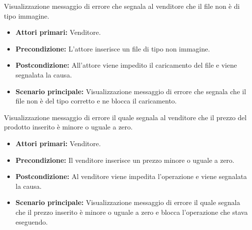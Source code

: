 \begin{comment}
\UC{Visualizzazione messaggio di errore prodotto non disponibile}
L'acquirente o l'utente non autenticato richiede un prodotto che non è disponibile.
\begin{itemize}
    \item \textbf{Attori primari:} acquirente o utente non autenticato;
    \item \textbf{Precondizione:} L'attore richiede di aggiungere al carrello un prodotto non disponibile;
    \item \textbf{Postcondizione:} viene impedita l'aggiunta al carrello e segnalata la causa.
    \item \textbf{Scenario principale:}
        \begin{itemize}
            \item L'utente richiede di aggiungere al carrello un prodotto non disponibile;
            \item Viene scartata la modifica, il carrello rimane invariato;
            \item Viene visualizzato un visualizzato un errore che indica la non disponibilità del prodotto.
        \end{itemize}
\end{itemize}
\end{comment}

Visualizzazione messaggio di errore che segnala al venditore che il file non è di tipo immagine.
\begin{itemize}
    \item \textbf{Attori primari:} Venditore.
    \item \textbf{Precondizione:} L'attore inserisce un file di tipo non immagine.
    \item \textbf{Postcondizione:} All'attore viene impedito il caricamento del file e viene segnalata la causa.
    \item \textbf{Scenario principale:} Visualizzazione messaggio di errore che segnala che il file non è del tipo corretto e ne blocca il caricamento.
\end{itemize}

Visualizzazione messaggio di errore il quale segnala al venditore che il prezzo del prodotto inserito è minore o uguale a zero.
\begin{itemize}
    \item \textbf{Attori primari:} Venditore.
    \item \textbf{Precondizione:} Il venditore inserisce un prezzo minore o uguale a zero.
    \item \textbf{Postcondizione:} Al venditore viene impedita l'operazione e viene segnalata la causa.
    \item \textbf{Scenario principale:} Visualizzazione messaggio di errore il quale segnala che il prezzo inserito è minore o uguale a zero e blocca l'operazione che stava eseguendo.
\end{itemize}

